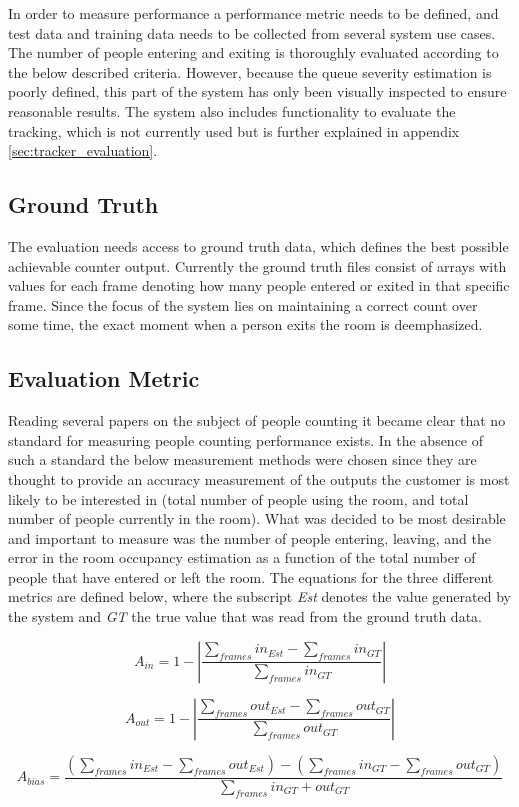In order to measure performance a performance metric needs to be defined, and test data and training data needs to be collected from several system use cases. The number of people entering and exiting is thoroughly evaluated according to the below described criteria. However, because the queue severity estimation is poorly defined, this part of the system has only been visually inspected to ensure reasonable results. The system also includes functionality to evaluate the tracking, which is not currently used but is further explained in appendix \ref{sec:tracker_evaluation}.

\subsection{Ground Truth}
The evaluation needs access to ground truth data, which defines the best possible achievable counter output. Currently the ground truth files consist of arrays with values for each frame denoting how many people entered or exited in that specific frame. Since the focus of the system lies on maintaining a correct count over some time, the exact moment when a person exits the room is deemphasized.

\subsection{Evaluation Metric}
Reading several papers on the subject of people counting it became clear that no standard for measuring people counting performance exists. In the absence of such a standard the below measurement methods were chosen since they are thought to provide an accuracy measurement of the outputs the customer is most likely to be interested in (total number of people using the room, and total number of people currently in the room).
What was decided to be most desirable and important to measure was the number of people entering, leaving, and the error in the room occupancy estimation as a function of the total number of people that have entered or left the room. The equations for the three different metrics are defined below, where the subscript \textit{Est} denotes the value generated by the system and \textit{GT} the true value that was read from the ground truth data.

\begin{equation}
\label{eq:in_accuracy}
A_{in} = 1 - |\frac{\sum_{frames}{in_{Est}}-\sum_{frames}{in_{GT}}}{\sum_{frames}in_{GT}}|
\end{equation} 

\begin{equation}
\label{eq:out_accuracy}
A_{out} = 1 - |\frac{\sum_{frames}{out_{Est}}-\sum_{frames}out_{GT}}{\sum_{frames}out_{GT}}| 
\end{equation} 

\begin{equation}
\label{eq:occupancy_bias}
A_{bias} = \frac{(\sum_{frames}{in_{Est}-\sum_{frames}out_{Est}})-(\sum_{frames}{in_{GT}-\sum_{frames}out_{GT}})}{\sum_{frames}in_{GT}+out_{GT}} 
\end{equation} 




